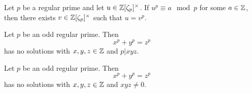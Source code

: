 \begin{theorem}\label{thm:Kummers_lemma}
	Let $p$ be a regular prime and let $u \in \mathbb{Z}[\zeta_p]^\times$. If $u^p \equiv a \mod p$ for some $a \in \mathbb{Z}$, then there exists $v \in \mathbb{Z}[\zeta_p]^\times$ such that $u=v^p$.
\end{theorem}

\begin{theorem}\label{theorem:FLT_case_two}
	\leanok
	Let $p$ be an odd regular prime. Then \[x^p+y^p=z^p\] has no solutions with $x,y,z \in \mathbb{Z}$ and $p | xyz$.
\end{theorem}


\begin{theorem}\label{FLT_regular}
	\leanok
	Let $p$ be an odd regular prime.  Then \[x^p+y^p=z^p\] has no solutions with $x,y,z \in \mathbb{Z}$ and $xyz \ne 0$.
\end{theorem}
